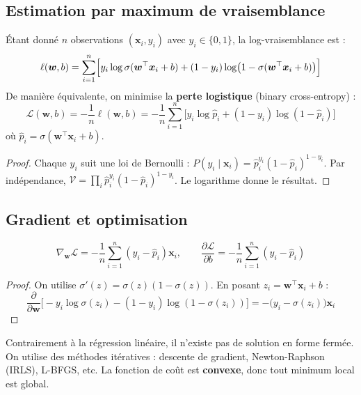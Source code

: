 \subsection{Estimation par maximum de vraisemblance}

\begin{theoreme}
\label{thm:logistic-mle}
\'Etant donn\'e $n$ observations $(\bm{x}_i, y_i)$ avec $y_i \in \{0, 1\}$,
la log-vraisemblance est :
\[
  \ell(\bm{w}, b) = \sum_{i=1}^{n} \Bigl[
    y_i \log \sigma(\bm{w}^\top \bm{x}_i + b)
    + (1 - y_i) \log\bigl(1 - \sigma(\bm{w}^\top \bm{x}_i + b)\bigr)
  \Bigr]
\]
De mani\`ere \'equivalente, on minimise la \textbf{perte logistique} (binary cross-entropy) :
\[
  \mathcal{L}(\bm{w}, b) = -\frac{1}{n}\ell(\bm{w}, b)
  = -\frac{1}{n}\sum_{i=1}^{n}\bigl[
    y_i \log \hat{p}_i + (1 - y_i)\log(1 - \hat{p}_i)
  \bigr]
\]
o\`u $\hat{p}_i = \sigma(\bm{w}^\top \bm{x}_i + b)$.
\end{theoreme}

\begin{proof}
Chaque $y_i$ suit une loi de Bernoulli : $P(y_i \mid \bm{x}_i) = \hat{p}_i^{y_i}(1-\hat{p}_i)^{1-y_i}$.
Par ind\'ependance, $\mathcal{V} = \prod_{i} \hat{p}_i^{y_i}(1-\hat{p}_i)^{1-y_i}$.
Le logarithme donne le r\'esultat.
\end{proof}

\subsection{Gradient et optimisation}

\begin{proposition}
\[
  \nabla_{\bm{w}} \mathcal{L} = -\frac{1}{n}\sum_{i=1}^{n}(y_i - \hat{p}_i)\bm{x}_i,
  \qquad
  \frac{\partial \mathcal{L}}{\partial b} = -\frac{1}{n}\sum_{i=1}^{n}(y_i - \hat{p}_i)
\]
\end{proposition}

\begin{proof}
On utilise $\sigma'(z) = \sigma(z)(1 - \sigma(z))$. En posant $z_i = \bm{w}^\top \bm{x}_i + b$ :
\[
  \frac{\partial}{\partial \bm{w}}\bigl[-y_i \log\sigma(z_i) - (1-y_i)\log(1-\sigma(z_i))\bigr]
  = -\bigl(y_i - \sigma(z_i)\bigr)\bm{x}_i
\]
\end{proof}

\begin{attention}[title=\textbf{Pas de solution analytique}]
Contrairement \`a la r\'egression lin\'eaire, il n'existe pas de solution en forme ferm\'ee.
On utilise des m\'ethodes it\'eratives : descente de gradient, Newton-Raphson (IRLS),
L-BFGS, etc. La fonction de co\^ut est \textbf{convexe}, donc tout minimum local est global.
\end{attention}

